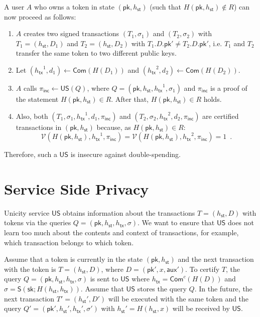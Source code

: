 \documentclass{article}
\newcommand{\sig}[0]{\mathsf{S}}
\newcommand{\pubkey}[0]{\mathsf{pk}}
\newcommand{\prikey}[0]{\mathsf{sk}}
\newcommand{\commit}[0]{\mathsf{Com}}
\newcommand{\commitc}[0]{{\mathsf{Com}^{c}}}
\newcommand{\unisrv}[0]{\mathsf{US}}
\newcommand{\sthash}[0]{{h_\mathsf{st}}}
\newcommand{\txhash}[0]{{h_\mathsf{tx}}}
\newcommand{\auxd}[0]{\mathsf{aux}}
\newcommand{\univer}[0]{\mathcal{V}}
\newcommand{\pinc}[0]{{\pi_{\mathsf{inc}}}}
\begin{document}
\noindent A user $A$ who owns a token in state $(\pubkey,\sthash)$ (such that $H(\pubkey,\sthash)\not\in R$) can now proceed as follows:
\begin{enumerate}
\item $A$ creates two signed transactions $(T_1,\sigma_1)$ and $(T_2,\sigma_2)$ with
$T_1=(\sthash,D_1)$ and $T_2=(\sthash,D_2)$ with $T_1.D.\pubkey'\neq T_2.D.\pubkey'$, i.e. $T_1$ and $T_2$ transfer the same token to two different public keys.
\item Let $(\txhash^1,d_1)\gets \commit(H(D_1))$ and $(\txhash^2,d_2)\gets \commit(H(D_2))$.
\item $A$ calls $\pinc\gets\unisrv(Q)$, where $Q=(\pubkey,\sthash,\txhash^1,\sigma_1)$ and $\pinc$ is a proof of the statement $H(\pubkey,\sthash)\in R$. After that, $H(\pubkey,\sthash)\in R$ holds.
\item Also, both $(T_1,\sigma_1,\txhash^1,d_1, \pinc)$ and $(T_2,\sigma_2,\txhash^2,d_2, \pinc)$ are certified transactions in $(\pubkey,\sthash)$ because, as $H(\pubkey,\sthash)\in R$:
\[
\univer(H(\pubkey,\sthash),\txhash^1,\pinc)=
\univer(H(\pubkey,\sthash),\txhash^2,\pinc)=1\enspace.
\]
\end{enumerate}

\noindent Therefore, such a $\unisrv$ is insecure against double-spending.

\section{Service Side Privacy}\label{sec:privacy}

Unicity service $\unisrv$ obtains information about the transactions $T=(\sthash,D)$ with tokens via the queries $Q=(\pubkey, \sthash, \txhash,\sigma)$. We want to ensure that $\unisrv$ does not learn too much about the contents and context of transactions, for example, which transaction belongs to which token.

Assume that a token is currently in the state $(\pubkey,\sthash)$ and the next transaction with the token is $T=(\sthash, D)$, where $D=(\pubkey',x,\auxd')$. To certify $T$, the query
$Q=(\pubkey,\sthash,\txhash,\sigma)$ is sent to $\unisrv$ where $\txhash=\commitc(H(D))$ and $\sigma = \sig(\prikey; H(\sthash,\txhash))$.
Assume that $\unisrv$ stores the query $Q$.
In the future, the next transaction $T'=(\sthash',D')$ will be executed with the same token and the query
$Q'=(\pubkey',\sthash',\txhash',\sigma')$ with $\sthash'=H(\sthash,x)$ will be received by $\unisrv$.
\end{document}
